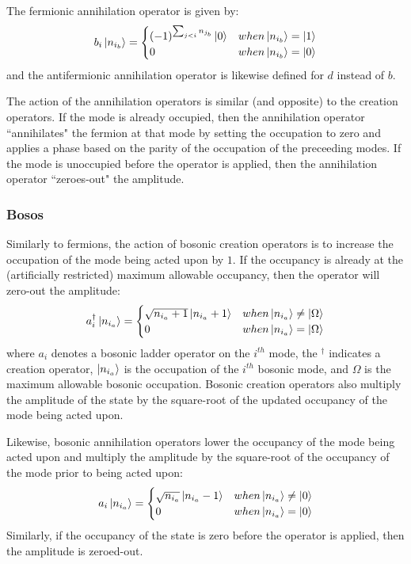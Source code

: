The fermionic annihilation operator is given by:
\begin{equation}
    b_i \ket{n_{i_b}} = 
    \begin{cases} 
        (-1)^{\sum_{j < i} n_{j_b}} \ket{0}  & when \ket{n_{i_b}} = \ket{1} \\
        0 & when \ket{n_{i_b}} = \ket{0}
    \end{cases}
\end{equation}
and the antifermionic annihilation operator is likewise defined for $d$ instead of $b$.

The action of the annihilation operators is similar (and opposite) to the creation operators.
If the mode is already occupied, then the annihilation operator ``annihilates" the fermion at that mode by setting the occupation to zero and applies a phase based on the parity of the occupation of the preceeding modes.
If the mode is unoccupied before the operator is applied, then the annihilation operator ``zeroes-out" the amplitude.

\subsubsection{Bosos}

Similarly to fermions, the action of bosonic creation operators is to increase the occupation of the mode being acted upon by $1$.
If the occupancy is already at the (artificially restricted) maximum allowable occupancy, then the operator will zero-out the amplitude:
\begin{equation}
    \label{eq:bosonic-creation}
    a_i^\dagger \ket{n_{i_a}} = 
    \begin{cases} 
        \sqrt{n_{i_a} + 1} \ket{n_{i_a} + 1}  & when \ket{n_{i_a}} \neq \ket{\Omega} \\
        0 & when \ket{n_{i_a}} = \ket{\Omega}
    \end{cases}
\end{equation}
where $a_i$ denotes a bosonic ladder operator on the $i^{th}$ mode, the $^\dagger$ indicates a creation operator, $\ket{n_{i_a}}$ is the occupation of the $i^{th}$ bosonic mode, and $\Omega$ is the maximum allowable bosonic occupation.
Bosonic creation operators also multiply the amplitude of the state by the square-root of the updated occupancy of the mode being acted upon.

Likewise, bosonic annihilation operators lower the occupancy of the mode being acted upon and multiply the amplitude by the square-root of the occupancy of the mode prior to being acted upon:
\begin{equation}
    \label{eq:bosonic-annihilation}
    a_i \ket{n_{i_a}} = 
    \begin{cases} 
        \sqrt{n_{i_a}} \ket{n_{i_a} - 1}  & when \ket{n_{i_a}} \neq \ket{0} \\
        0 & when \ket{n_{i_a}} = \ket{0}
    \end{cases}
\end{equation}
Similarly, if the occupancy of the state is zero before the operator is applied, then the amplitude is zeroed-out.

